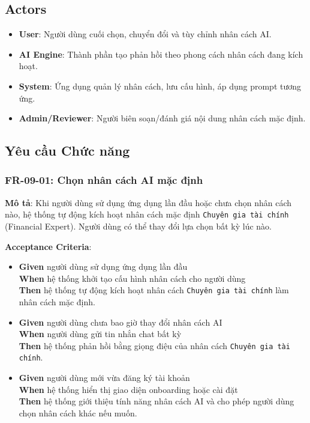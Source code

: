 \subsection{Actors}

\begin{itemize}
\item \textbf{User}: Người dùng cuối chọn, chuyển đổi và tùy chỉnh nhân cách AI.
\item \textbf{AI Engine}: Thành phần tạo phản hồi theo phong cách nhân cách đang kích hoạt.
\item \textbf{System}: Ứng dụng quản lý nhân cách, lưu cấu hình, áp dụng prompt tương ứng.
\item \textbf{Admin/Reviewer}: Người biên soạn/đánh giá nội dung nhân cách mặc định.
\end{itemize}
\subsection{Yêu cầu Chức năng}



\subsubsection{FR-09-01: Chọn nhân cách AI mặc định}

\textbf{Mô tả}: Khi người dùng sử dụng ứng dụng lần đầu hoặc chưa chọn nhân cách nào, hệ thống tự động kích hoạt nhân cách mặc định \texttt{Chuyên gia tài chính} (Financial Expert). Người dùng có thể thay đổi lựa chọn bất kỳ lúc nào.



\textbf{Acceptance Criteria}:

\begin{itemize}
\item \textbf{Given} người dùng sử dụng ứng dụng lần đầu  \\ \hspace*{1.5em}  \textbf{When} hệ thống khởi tạo cấu hình nhân cách cho người dùng  \\ \hspace*{1.5em}  \textbf{Then} hệ thống tự động kích hoạt nhân cách \texttt{Chuyên gia tài chính} làm nhân cách mặc định.
\item \textbf{Given} người dùng chưa bao giờ thay đổi nhân cách AI  \\ \hspace*{1.5em}  \textbf{When} người dùng gửi tin nhắn chat bất kỳ  \\ \hspace*{1.5em}  \textbf{Then} hệ thống phản hồi bằng giọng điệu của nhân cách \texttt{Chuyên gia tài chính}.
\item \textbf{Given} người dùng mới vừa đăng ký tài khoản  \\ \hspace*{1.5em}  \textbf{When} hệ thống hiển thị giao diện onboarding hoặc cài đặt  \\ \hspace*{1.5em}  \textbf{Then} hệ thống giới thiệu tính năng nhân cách AI và cho phép người dùng chọn nhân cách khác nếu muốn.
\end{itemize}
